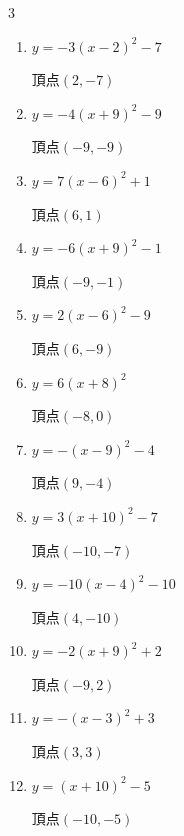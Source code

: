 \begin{multicols}{3}
\begin{enumerate}
  \item $\displaystyle y=-3\left( x-2\right)^{2}-7$

        $\displaystyle 頂点\left( 2 , -7 \right)$

  \item $\displaystyle y=-4\left( x+9\right)^{2}-9$

        $\displaystyle 頂点\left( -9 , -9 \right)$

  \item $\displaystyle y=7\left( x-6\right)^{2}+1$

        $\displaystyle 頂点\left( 6 , 1 \right)$

  \item $\displaystyle y=-6\left( x+9\right)^{2}-1$

        $\displaystyle 頂点\left( -9 , -1 \right)$

  \item $\displaystyle y=2\left( x-6\right)^{2}-9$

        $\displaystyle 頂点\left( 6 , -9 \right)$

  \item $\displaystyle y=6\left( x+8\right)^{2}$

        $\displaystyle 頂点\left( -8 , 0 \right)$

  \item $\displaystyle y=-\left( x-9\right)^{2}-4$

        $\displaystyle 頂点\left( 9 , -4 \right)$

  \item $\displaystyle y=3\left( x+10\right)^{2}-7$

        $\displaystyle 頂点\left( -10 , -7 \right)$

  \item $\displaystyle y=-10\left( x-4\right)^{2}-10$

        $\displaystyle 頂点\left( 4 , -10 \right)$

  \item $\displaystyle y=-2\left( x+9\right)^{2}+2$

        $\displaystyle 頂点\left( -9 , 2 \right)$

  \item $\displaystyle y=-\left( x-3\right)^{2}+3$

        $\displaystyle 頂点\left( 3 , 3 \right)$

  \item $\displaystyle y=\left( x+10\right)^{2}-5$

        $\displaystyle 頂点\left( -10 , -5 \right)$


\end{enumerate}
\end{multicols}

